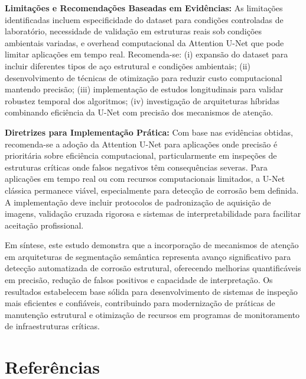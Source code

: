 \documentclass[12pt,a4paper,twoside]{article}
\begin{document}
\textbf{Limitações e Recomendações Baseadas em Evidências:} As limitações identificadas incluem especificidade do dataset para condições controladas de laboratório, necessidade de validação em estruturas reais sob condições ambientais variadas, e overhead computacional da Attention U-Net que pode limitar aplicações em tempo real. Recomenda-se: (i) expansão do dataset para incluir diferentes tipos de aço estrutural e condições ambientais; (ii) desenvolvimento de técnicas de otimização para reduzir custo computacional mantendo precisão; (iii) implementação de estudos longitudinais para validar robustez temporal dos algoritmos; (iv) investigação de arquiteturas híbridas combinando eficiência da U-Net com precisão dos mecanismos de atenção.

\textbf{Diretrizes para Implementação Prática:} Com base nas evidências obtidas, recomenda-se a adoção da Attention U-Net para aplicações onde precisão é prioritária sobre eficiência computacional, particularmente em inspeções de estruturas críticas onde falsos negativos têm consequências severas. Para aplicações em tempo real ou com recursos computacionais limitados, a U-Net clássica permanece viável, especialmente para detecção de corrosão bem definida. A implementação deve incluir protocolos de padronização de aquisição de imagens, validação cruzada rigorosa e sistemas de interpretabilidade para facilitar aceitação profissional.

Em síntese, este estudo demonstra que a incorporação de mecanismos de atenção em arquiteturas de segmentação semântica representa avanço significativo para detecção automatizada de corrosão estrutural, oferecendo melhorias quantificáveis em precisão, redução de falsos positivos e capacidade de interpretação. Os resultados estabelecem base sólida para desenvolvimento de sistemas de inspeção mais eficientes e confiáveis, contribuindo para modernização de práticas de manutenção estrutural e otimização de recursos em programas de monitoramento de infraestruturas críticas.



\section{Referências}
\label{sec:referencias}



\end{document}
